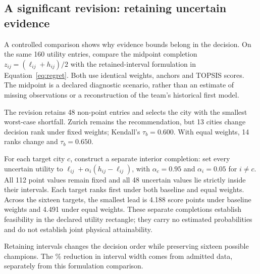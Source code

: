 \subsection{A significant revision: retaining uncertain evidence}
A controlled comparison shows why evidence bounds belong in the decision.
On the same 160 utility entries, compare the midpoint completion $z_{ij}=(\ell_{ij}+h_{ij})/2$ with the retained-interval formulation in Equation~\ref{eq:regret}. Both use identical weights, anchors and TOPSIS scores. The midpoint is a declared diagnostic scenario, rather than an estimate of missing observations or a reconstruction of the team's historical first model.

The revision retains 48 non-point entries and selects the city with the smallest worst-case shortfall. Zurich remains the recommendation, but 13 cities change decision rank under fixed weights; Kendall's $\tau_b=0.600$. With equal weights, 14 ranks change and $\tau_b=0.650$.

For each target city $c$, construct a separate interior completion: set every uncertain utility to $\ell_{ij}+\alpha_i(h_{ij}-\ell_{ij})$, with $\alpha_c=0.95$ and $\alpha_i=0.05$ for $i\ne c$. All 112 point values remain fixed and all 48 uncertain values lie strictly inside their intervals. Each target ranks first under both baseline and equal weights. Across the sixteen targets, the smallest lead is 4.188 score points under baseline weights and 4.491 under equal weights. These separate completions establish feasibility in the declared utility rectangle; they carry no estimated probabilities and do not establish joint physical attainability.

Retaining intervals changes the decision order while preserving sixteen possible champions. The \TotalWidthReduction\% reduction in interval width comes from admitted data, separately from this formulation comparison.
